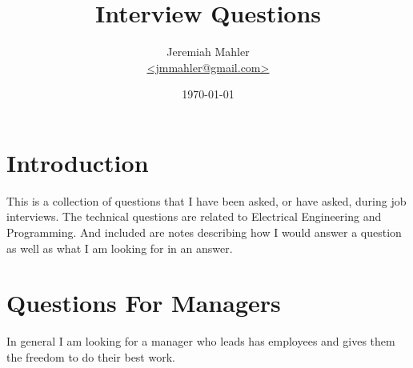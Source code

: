 \documentclass{article}
\begin{document}
\title{Interview Questions}
\author{
	\Large{Jeremiah Mahler}\\
	\small{\href{mailto:jmmahler@gmail.com}{\textless jmmahler@gmail.com\textgreater}}
}
\date{\today}
\maketitle


\section{Introduction}

This is a collection of questions that I have been asked, or have asked,
during job interviews.
The technical questions are related to Electrical Engineering and Programming.
And included are notes describing how I would answer a question as
well as what I am looking for in an answer.

\section{Questions For Managers}

In general I am looking for a manager who leads has employees and gives
them the freedom to do their best work.
\end{document}
